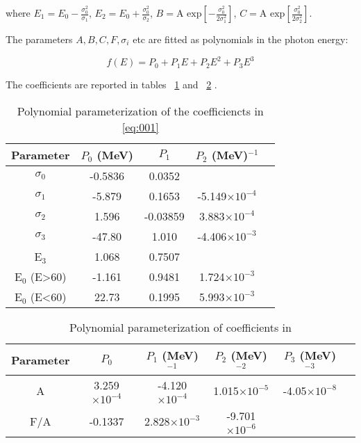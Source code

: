 where $E_1=E_0 - \frac{\sigma_0^2}{\sigma_1}$, $E_2 =E_0 + \frac{\sigma_0^2}{\sigma_2}$,
 $B=\text{A exp}\left[-\frac{\sigma_0^2}{2\sigma_1^2}\right]$, 
 $C=\text{A exp}\left[\frac{\sigma_0^2}{2\sigma_2^2}\right]$. 

 The parameters $A, B ,C , F, \sigma_i$  etc are fitted as polynomials in the photon energy:
 
\begin{equation}
  f(E)= P_0+P_1E+P_2E^2+P_3E^3
\end{equation}

The coefficients are reported in tables ~\ref{tab:coefficients1} and ~\ref{tab:coefficients2} .

\begin{table}[!h]
\begin{center}
\begin{tabular}{| c | c | c | c | c | }
\hline
Parameter & $P_0$ (MeV)& $P_1$ & $P_2$ (MeV)$^{-1}$ \\ \hline
$\sigma_0$ & -0.5836 & 0.0352 & \\ \hline
$\sigma_1$ & -5.879 & 0.1653 & -5.149$\times 10^{-4}$ \\ \hline
$\sigma_2$ & 1.596 & -0.03859 & 3.883$\times 10^{-4}$ \\ \hline
$\sigma_3$ & -47.80 & 1.010 & -4.406$\times 10^{-3}$ \\ \hline
E$_3$ & 1.068 & 0.7507 & \\ \hline
E$_0$ (E>60) & -1.161 & 0.9481 & 1.724$\times 10^{-3}$ \\ \hline
E$_0$ (E<60) & 22.73 & 0.1995 & 5.993$\times 10^{-3}$ \\ \hline

\end{tabular}
\end{center}
\caption{
  Polynomial parameterization of the coefficiencts in \ref{eq:001}
  \label{tab:coefficients1}}
\end{table}

\begin{table}[!h]
\begin{center}
\begin{tabular}{| c | c | c | c | c | c |}
\hline
Parameter & $P_0$ & $P_1$ (MeV)$^{-1}$ & $P_2$ (MeV)$^{-2}$  & $P_3$ (MeV)$^{-3}$\\ \hline
A & 3.259$\times 10^{-4}$ & -4.120$\times 10^{-4}$ & 1.015$\times 10^{-5}$ & -4.05$\times 10^{-8}$  \\ \hline
F/A & -0.1337 & 2.828$\times 10^{-3}$ & -9.701$\times 10^{-6}$ & \\ \hline
\end{tabular}
\end{center}
\caption{Polynomial parameterization of coefficients in \label{tab:coefficients2}}
\end{table}

